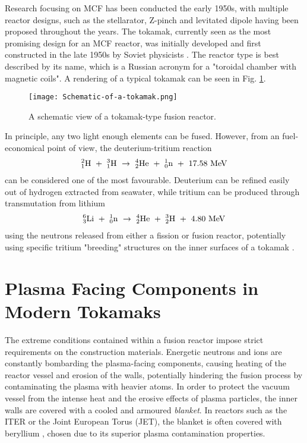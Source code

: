 Research focusing on MCF has been conducted the early 1950s, with multiple reactor designs, such as the stellarator, Z-pinch and levitated dipole having been proposed throughout the years. 
The tokamak, currently seen as the most promising design for an MCF reactor, was initially developed and first constructed in the late 1950s by Soviet physicists \cite{tokamakorigins}. 
The reactor type is best described by its name, which is a Russian acronym for a "toroidal chamber with magnetic coils".
A rendering of a typical tokamak can be seen in Fig. \ref{fig:tokamak}.

\begin{figure}[!ht]
\center
\texttt{[image: Schematic-of-a-tokamak.png]}
\caption{A schematic view of a tokamak-type fusion reactor.} 
\label{fig:tokamak}
\end{figure}

In principle, any two light enough elements can be fused. 
However, from an fuel-economical point of view, the deuterium-tritium reaction 
\begin{align}
^2_1\rm{H} ~+~ ^3_1\rm{H} ~\rightarrow~ ^4_2\rm{He} ~+~ ^1_0\rm{n} ~+~ 17.58 ~\rm{MeV}
\label{Eq:D-T-reaction}
\end{align}
can be considered one of the most favourable. 
Deuterium can be refined easily out of hydrogen extracted from seawater, while tritium can be produced through transmutation from lithium
\begin{align}
^6_3\rm{Li} ~+~ ^1_0\rm{n} ~\rightarrow~ ^4_2\rm{He} ~+~ ^3_2\rm{H} ~+~ 4.80  ~\rm{MeV}
\end{align}
using the neutrons released from either a fission or fusion reactor, potentially using specific tritium "breeding" structures on the inner surfaces of a tokamak \cite{giancarli2012overview}.


\section{Plasma Facing Components in Modern Tokamaks}

The extreme conditions contained within a fusion reactor impose strict requirements on the construction materials. 
Energetic neutrons and ions are constantly bombarding the plasma-facing components, causing heating of the reactor vessel and erosion of the walls, potentially hindering the fusion process by contaminating the plasma with heavier atoms. 
In order to protect the vacuum vessel from the intense heat and the erosive effects of plasma particles, the inner walls are covered with a cooled and armoured \textit{blanket}. 
In reactors such as the ITER or the Joint European Torus (JET), the blanket is often covered with beryllium \cite{raffray2012overview}, chosen due to its superior plasma contamination properties.

